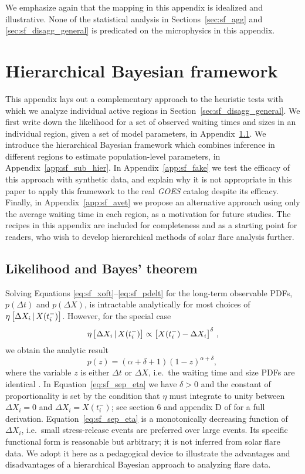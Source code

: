 \begin{subappendices}
We emphasize again that the mapping in this appendix is idealized and illustrative. None of the statistical analysis in Sections~\ref{sec:sf_agg} and \ref{sec:sf_disagg_general} is predicated on the microphysics in this appendix.

\section{Hierarchical Bayesian framework} \label{app:sf_hierarch}
This appendix lays out a complementary approach to the heuristic tests with which we analyze individual active regions in Section~\ref{sec:sf_disagg_general}. We first write down the likelihood for a set of observed waiting times and sizes in an individual region, given a set of model parameters, in Appendix~\ref{app:sf_likelihood}. We introduce the hierarchical Bayesian framework which combines inference in different regions to estimate population-level parameters, in Appendix~\ref{app:sf_sub_hier}. In Appendix~\ref{app:sf_fake} we test the efficacy of this approach with synthetic data, and explain why it is not appropriate in this paper to apply this framework to the real \emph{GOES} catalog despite its efficacy. Finally, in Appendix~\ref{app:sf_avet} we propose an alternative approach using only the average waiting time in each region, as a motivation for future studies. The recipes in this appendix are included for completeness and as a starting point for readers, who wish to develop hierarchical methods of solar flare analysis further. 

\subsection{Likelihood and Bayes' theorem} \label{app:sf_likelihood}
Solving Equations \eqref{eq:sf_xoft}--\eqref{eq:sf_pdelt} for the long-term observable PDFs, $p(\Delta t)$ and $p(\Delta X)$, is intractable analytically for most choices of $\eta\left[\Delta X_{i}\,|\,X(t_i^-)\right]$. However, for the special case
\begin{equation}
\eta\left[\Delta X_{i}\,|\,X(t_i^-)\right] \propto \left[X(t_i^-) - \Delta X_i \right]^\delta\,, \label{eq:sf_sep_eta}
\end{equation}
we obtain the analytic result
\begin{equation}
p(z) = (\alpha + \delta + 1) (1 - z)^{\alpha + \delta},\, \label{eq:sf_sep_pdfs}
\end{equation}
where the variable $z$ is either $\Delta t$ or $\Delta X$, i.e.~the waiting time and size PDFs are identical \citep{Fulgenzi2017}. In Equation~\eqref{eq:sf_sep_eta} we have $\delta > 0$ and the constant of proportionality is set by the condition that $\eta$ must integrate to unity between $\Delta X_i = 0$ and $\Delta X_i = X(t_i^-)$; see section 6 and appendix D of \citet{Fulgenzi2017} for a full derivation. Equation~\eqref{eq:sf_sep_eta} is a monotonically decreasing function of $\Delta X_i$, i.e.~small stress-release events are preferred over large events. Its specific functional form is reasonable but arbitrary; it is not inferred from solar flare data. We adopt it here as a pedagogical device to illustrate the advantages and disadvantages of a hierarchical Bayesian approach to analyzing flare data.


\end{subappendices}
